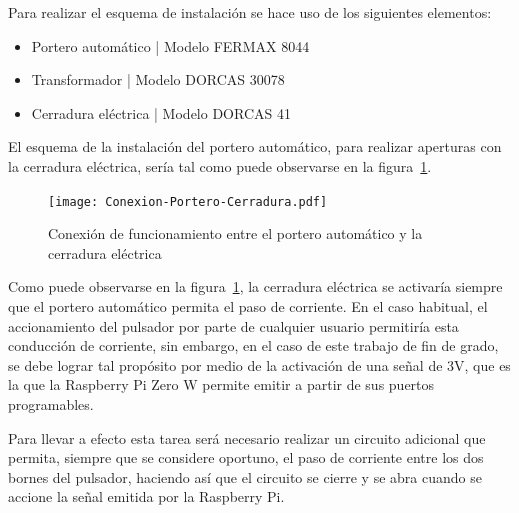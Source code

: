 Para realizar el esquema de instalación se hace uso de los siguientes elementos:
\begin{itemize}
\item{Portero automático | Modelo FERMAX 8044}
\item{Transformador | Modelo DORCAS 30078}
\item{Cerradura eléctrica | Modelo DORCAS 41}
\end{itemize}
El esquema de la instalación del portero automático, para realizar aperturas con la cerradura eléctrica, sería tal como puede observarse en la figura~\ref{fig:conexion-portero-cerradura}.
\begin{figure}[tbp]
\centering
\texttt{[image: Conexion-Portero-Cerradura.pdf]}
\caption{Conexión de funcionamiento entre el portero automático y la cerradura eléctrica}
\label{fig:conexion-portero-cerradura}
\end{figure}
Como puede observarse en la figura~\ref{fig:conexion-portero-cerradura}, la cerradura eléctrica se activaría siempre que el portero automático permita el paso de corriente. En el caso habitual, el accionamiento del pulsador por parte de cualquier usuario permitiría esta conducción de corriente, sin embargo, en el caso de este trabajo de fin de grado, se debe lograr tal propósito por medio de la activación de una señal de 3V, que es la que la Raspberry Pi Zero W permite emitir a partir de sus puertos programables.

Para llevar a efecto esta tarea será necesario realizar un circuito adicional que permita, siempre que se considere oportuno, el paso de corriente entre los dos bornes del pulsador, haciendo así que el circuito se cierre y se abra cuando se accione la señal emitida por la Raspberry Pi.

